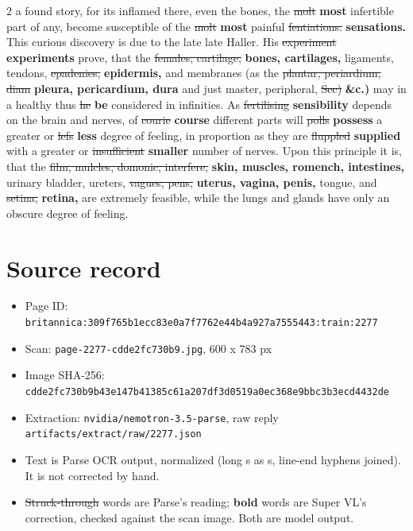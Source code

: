 \documentclass[10pt]{article}
\begin{document}
\begin{multicols}{2}
a found story, for its inflamed there, even the bones, the \sout{molt} \textbf{most} infertible part of any, become susceptible of the \sout{molt} \textbf{most} painful \sout{fentiations.} \textbf{sensations.} This curious discovery is due to the late late Haller. His \sout{experiment} \textbf{experiments} prove, that the \sout{females, cartilage,} \textbf{bones, cartilages,} ligaments, tendons, \sout{epadenies,} \textbf{epidermis,} and membranes (as the \sout{plantar, periardium, diam} \textbf{pleura, pericardium, dura} and just master, peripheral, \sout{Sec)} \textbf{\&c.)} may in a healthy thus \sout{he} \textbf{be} considered in infinities. As \sout{fertilising} \textbf{sensibility} depends on the brain and nerves, of \sout{courie} \textbf{course} different parts will \sout{polls} \textbf{possess} a greater or \sout{lefs} \textbf{less} degree of feeling, in proportion as they are \sout{fluppled} \textbf{supplied} with a greater or \sout{insufficient} \textbf{smaller} number of nerves. Upon this principle it is, that the \sout{film, mulcles, domonic, interfere,} \textbf{skin, muscles, romench, intestines,} urinary bladder, ureters, \sout{vagues, pens,} \textbf{uterus, vagina, penis,} tongue, and \sout{setina,} \textbf{retina,} are extremely feasible, while the lungs and glands have only an obscure degree of feeling.
\end{multicols}
\section*{Source record}
\begin{itemize}
\item Page ID: \texttt{britannica:309f765b1ecc83e0a7f7762e44b4a927a7555443:train:2277}
\item Scan: \texttt{page-2277-cdde2fc730b9.jpg}, 600 x 783 px
\item Image SHA-256: \texttt{\small cdde2fc730b9b43e147b41385c61a207df3d0519a0ec368e9bbc3b3ecd4432de}
\item Extraction: \texttt{nvidia/nemotron-3.5-parse}, raw reply \texttt{artifacts/extract/raw/2277.json}
\item Text is Parse OCR output, normalized (long s as s, line-end hyphens joined). It is not corrected by hand.
\item \sout{Struck-through} words are Parse's reading; \textbf{bold} words are Super VL's correction, checked against the scan image. Both are model output.
\end{itemize}
\end{document}
